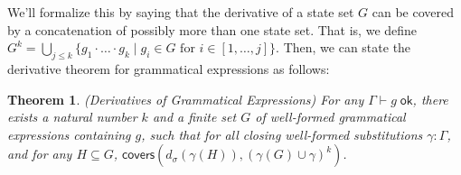 \documentclass{article}
\newcommand{\judgeok}[2][\Gamma]{{#1} \vdash {#2} \;\mathsf{ok}}
\newcommand{\setof}[1]{\{{#1}\}}
\newcommand{\comprehend}[2]{\setof{{#1}\;|\;{#2}}}
\newcommand{\deriv}[2]{d_{#1}({#2})}
\newcommand{\covers}[2]{\mathsf{covers}({#1}, {#2})}
\newtheorem{theorem}{Theorem}
\begin{document}
We'll formalize this by saying that the derivative of a state set $G$
can be covered by a concatenation of possibly more than one state
set. That is, we define $G^k = \bigcup\limits_{j \leq k} \comprehend{
  g_1\cdot\ldots\cdot g_k }{ g_i \in G \mbox{ for } i \in
  [1,\ldots,j]}$.  Then, we can state the derivative theorem for
grammatical expressions as follows:


\begin{theorem}{(Derivatives of Grammatical Expressions)}
For any $\judgeok{g}$, there exists a natural number $k$ and a finite
set $G$ of well-formed grammatical expressions containing $g$, such
that for all closing well-formed substitutions $\gamma:\Gamma$, and
for any $H \subseteq G$, $\covers{\deriv{\sigma}{\gamma(H)}}{(\gamma(G) \cup
\gamma)^k}$.
\end{theorem}
\end{document}
